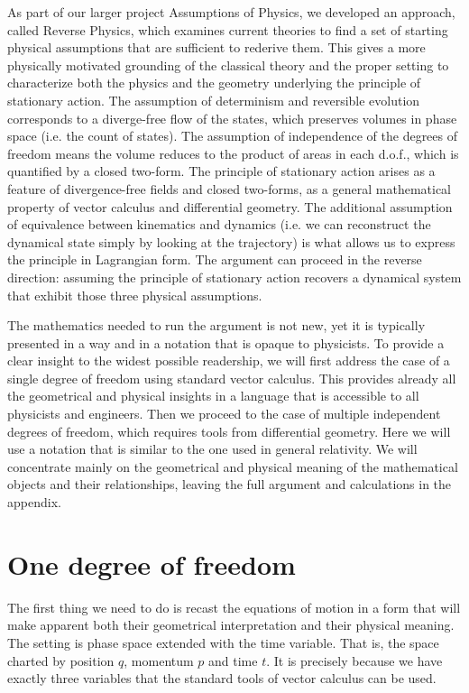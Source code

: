 \documentclass[10pt,twocolumn, nofootinbib]{revtex4-2}
\begin{document}
As part of our larger project Assumptions of Physics, we developed an approach, called Reverse Physics, which examines current theories to find a set of starting physical assumptions that are sufficient to rederive them. This gives a more physically motivated grounding of the classical theory and the proper setting to characterize both the physics and the geometry underlying the principle of stationary action. The assumption of determinism and reversible evolution corresponds to a diverge-free flow of the states, which preserves volumes in phase space (i.e. the count of states). The assumption of independence of the degrees of freedom means the volume reduces to the product of areas in each d.o.f., which is quantified by a closed two-form. The principle of stationary action arises as a feature of divergence-free fields and closed two-forms, as a general mathematical property of vector calculus and differential geometry\cite{souriau1997structure}. The additional assumption of equivalence between kinematics and dynamics (i.e. we can reconstruct the dynamical state simply by looking at the trajectory) is what allows us to express the principle in Lagrangian form. The argument can proceed in the reverse direction: assuming the principle of stationary action recovers a dynamical system that exhibit those three physical assumptions.

The mathematics needed to run the argument is not new, yet it is typically presented in a way and in a notation that is opaque to physicists. To provide a clear insight to the widest possible readership, we will first address the case of a single degree of freedom using standard vector calculus. This provides already all the geometrical and physical insights in a language that is accessible to all physicists and engineers. Then we proceed to the case of multiple independent degrees of freedom, which requires tools from differential geometry. Here we will use a notation that is similar to the one used in general relativity. We will concentrate mainly on the geometrical and physical meaning of the mathematical objects and their relationships, leaving the full argument and calculations in the appendix.

\section{One degree of freedom}

The first thing we need to do is recast the equations of motion in a form that will make apparent both their geometrical interpretation and their physical meaning. The setting is phase space extended with the time variable. That is, the space charted by position $q$, momentum $p$ and time $t$. It is precisely because we have exactly three variables that the standard tools of vector calculus can be used.
\end{document}
